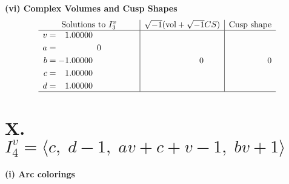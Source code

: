 \documentclass[1p]{elsarticle_modified}
\theoremstyle{definition}
\newcommand{\I}{\sqrt{-1}}
\begin{document}
\newpage\flushleft \textbf{(vi) Complex Volumes and Cusp Shapes}
$$\begin{array}{c|c|c}  
\text{Solutions to }I^v_{3}& \I (\text{vol} + \sqrt{-1}CS) & \text{Cusp shape}\\
 \hline 
\begin{aligned}
v &= \phantom{-}1.00000\phantom{ +0.000000I} \\
a &= \phantom{-0.000000 } 0 \\
b &= -1.00000\phantom{ +0.000000I} \\
c &= \phantom{-}1.00000\phantom{ +0.000000I} \\
d &= \phantom{-}1.00000\phantom{ +0.000000I}\end{aligned}
 & \phantom{-0.000000 } 0 & \phantom{-0.000000 } 0\\
 \hline 
 \end{array}$$\newpage\newpage\renewcommand{\arraystretch}{1}
\centering \section*{X. $I^v_{4}= \langle c,\;d-1,\;a v+c+v-1,\;b v+1 \rangle$}
\flushleft \textbf{(i) Arc colorings}\\
\end{document}
